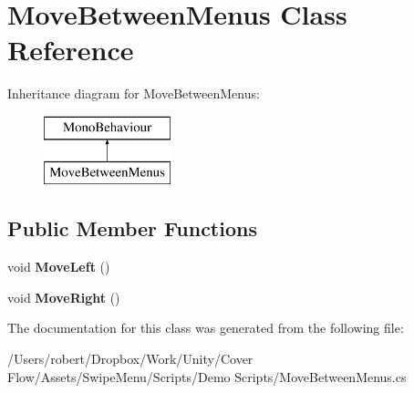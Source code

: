 \hypertarget{class_move_between_menus}{}\section{Move\+Between\+Menus Class Reference}
\label{class_move_between_menus}
Inheritance diagram for Move\+Between\+Menus\+:\begin{figure}[H]
\begin{center}
\leavevmode
\includegraphics[height=2.000000cm]{class_move_between_menus}
\end{center}
\end{figure}
\subsection*{Public Member Functions}
\begin{DoxyCompactItemize}
\item 
\hypertarget{class_move_between_menus_a1541d87224f1d6b4c24ddf1cba449714}{}void {\bfseries Move\+Left} ()\label{class_move_between_menus_a1541d87224f1d6b4c24ddf1cba449714}

\item 
\hypertarget{class_move_between_menus_a307eb72f5bbf6f1e4dccf37bf7070787}{}void {\bfseries Move\+Right} ()\label{class_move_between_menus_a307eb72f5bbf6f1e4dccf37bf7070787}

\end{DoxyCompactItemize}


The documentation for this class was generated from the following file\+:\begin{DoxyCompactItemize}
\item 
/\+Users/robert/\+Dropbox/\+Work/\+Unity/\+Cover Flow/\+Assets/\+Swipe\+Menu/\+Scripts/\+Demo Scripts/Move\+Between\+Menus.\+cs\end{DoxyCompactItemize}
